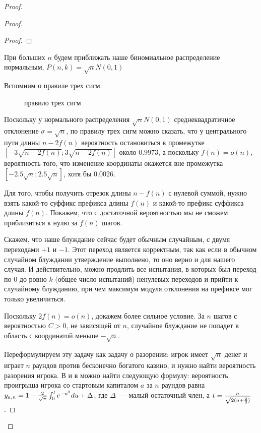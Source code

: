 \begin{proof}
\begin{proof}
\begin{proof}
\end{proof}

При больших $n$ будем приближать наше биномиальное распределение нормальным, $P(n, k)=\sqrt {n} N(0,1)$

Вспомним о правиле трех сигм.

\begin{figure}[h]
\caption{правило трех сигм \cite{3}}
\end{figure}

Поскольку у нормального распределения $\sqrt {n} N(0,1)$ среднеквадратичное отклонение $\sigma = \sqrt{n}$, по правилу трех сигм можно сказать, что у центрального пути длины $n-2f(n)$ вероятность остановиться в промежутке $[-3\sqrt{n-2f(n)}; 3\sqrt{n-2f(n)}]$ около 0.9973, а поскольку $f(n)=o(n)$, вероятность того, что изменение координаты окажется вне промежутка $[-2.5\sqrt{n}; 2.5\sqrt{n}]$, хотя бы 0.0026.

Для того, чтобы получить отрезок длины $n-f(n)$ с нулевой суммой, нужно взять какой-то суффикс префикса длины $f(n)$ и какой-то префикс суффикса длины $f(n)$. Покажем, что с достаточной вероятностью мы не сможем приблизиться к нулю за $f(n)$ шагов.

Скажем, что наше блуждание сейчас будет обычным случайным, с двумя переходами $+1$ и $-1$. Этот переход является корректным, так как если в обычном случайном блуждании утверждение выполнено, то оно верно и для нашего случая. И действительно, можно продлить все испытания, в которых был переход по 0 до ровно $k$ (общее число испытаний) ненулевых переходов и прийти к случайному блужданию, при чем максимум модуля отклонения на префиксе мог только увеличиться.

Поскольку $2f(n)=o(n)$, докажем более сильное условие. За $n$ шагов с вероятностью $C>0$, не зависящей от $n$, случайное блуждание не попадет в область с координатой меньше $-\sqrt{n}$. 

Переформулируем эту задачу как задачу о разорении: игрок имеет $\sqrt{n}$ денег и играет $n$ раундов против бесконечно богатого казино, и нужно найти вероятность разорения игрока. В \cite{7} и в \cite{8} можно найти следующую формулу: вероятность проигрыша игрока со стартовым капиталом $a$ за $n$ раундов равна $y_{a,n}=1-{{2} \over {\sqrt{\pi}}} \int_0^t e^{-u^2} du + \Delta$, где $\Delta$~--- малый остаточный член, а $t={{a} \over {\sqrt{2(n+{{2}\over 3})}}}$.


\end{proof}
\end{proof}
